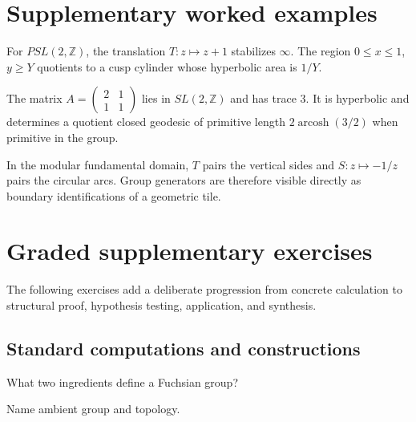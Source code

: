 \section{Supplementary worked examples}
\label{sec:vii35-pedagogy}

\begin{example}\label{ex:vii35-ped-01}
For \(PSL(2,\mathbb Z)\), the translation \(T:z\mapsto z+1\) stabilizes \(\infty\).  The region \(0\le x\le1\), \(y\ge Y\) quotients to a cusp cylinder whose hyperbolic area is \(1/Y\).
\end{example}

\begin{example}\label{ex:vii35-ped-02}
The matrix \(A=\begin{pmatrix}2&1\\1&1\end{pmatrix}\) lies in \(SL(2,\mathbb Z)\) and has trace \(3\).  It is hyperbolic and determines a quotient closed geodesic of primitive length \(2\operatorname{arcosh}(3/2)\) when primitive in the group.
\end{example}

\begin{example}\label{ex:vii35-ped-03}
In the modular fundamental domain, \(T\) pairs the vertical sides and \(S:z\mapsto-1/z\) pairs the circular arcs.  Group generators are therefore visible directly as boundary identifications of a geometric tile.
\end{example}

\section{Graded supplementary exercises}
The following exercises add a deliberate progression from concrete calculation to structural proof, hypothesis testing, application, and synthesis.

\subsection*{Standard computations and constructions}

\begin{exercise}\label{exr:vii35-ped-01}
What two ingredients define a Fuchsian group?
\end{exercise}

\begin{hint}
Name ambient group and topology.
\end{hint}

